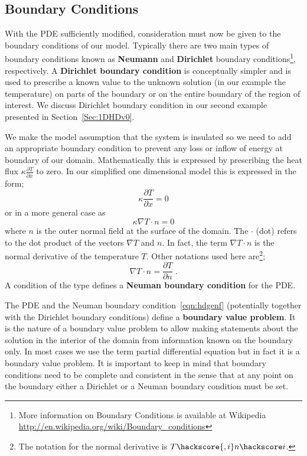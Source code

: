\subsection{Boundary Conditions}
\label{SEC BOUNDARY COND}
With the PDE sufficiently modified, consideration must now be given to the boundary conditions of our model. Typically there are two main types of boundary conditions known as \textbf{Neumann} and \textbf{Dirichlet} boundary conditions\footnote{More information on Boundary Conditions is available at Wikipedia \url{http://en.wikipedia.org/wiki/Boundary_conditions}}, respectively. 
A \textbf{Dirichlet boundary condition} is conceptually simpler and is used to prescribe a known value to the unknown solution (in our example the temperature) on parts of the boundary or on the entire boundary of the region of interest. 
We discuss Dirichlet boundary condition in our second example presented in Section~\ref{Sec:1DHDv0}.

We make the model assumption that the system is insulated so we need
to add an appropriate boundary condition to prevent
any loss or inflow of energy at boundary of our domain. Mathematically this is expressed by prescribing
the heat flux $\kappa \frac{\partial T}{\partial x}$  to zero. In our simplified one dimensional model this is expressed
in the form;
\begin{equation}
\kappa \frac{\partial T}{\partial x}  = 0 
\end{equation}
or in a more general case as
\begin{equation}\label{NEUMAN 1}
\kappa \nabla T \cdot n  = 0 
\end{equation}
where $n$  is the outer normal field  at the surface of the domain. 
The $\cdot$ (dot) refers to the  dot product of the vectors $\nabla T$ and $n$. In fact, the term $\nabla T \cdot n$ is the normal derivative of 
the temperature $T$. Other notations used here are\footnote{The \esc notation for the normal
derivative is $T\hackscore{,i} n\hackscore i$.};
\begin{equation}
\nabla T \cdot n  = \frac{\partial T}{\partial n} \; .
\end{equation}
A condition of the type  defines a \textbf{Neuman boundary condition} for the PDE. 

The PDE  
and the Neuman boundary condition~\ref{eqn:hdgenf} (potentially together with the Dirichlet boundary conditions)  define a \textbf{boundary value problem}. 
It is the nature of a boundary value problem to allow making statements about the solution in the
interior of the domain from information known on the boundary only. In most cases
we use the term partial differential equation but in fact it is a boundary value problem. 
It is important to keep in mind that boundary conditions need to be complete and consistent in the sense that 
at any point on the boundary either a Dirichlet or a Neuman boundary condition must be set.

